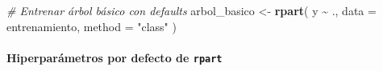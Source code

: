 \documentclass[
]{article}
\newenvironment{Shaded}{\begin{snugshade}}{\end{snugshade}}
\newcommand{\AttributeTok}[1]{\textcolor[rgb]{0.13,0.29,0.53}{#1}}
\newcommand{\CommentTok}[1]{\textcolor[rgb]{0.56,0.35,0.01}{\textit{#1}}}
\newcommand{\FunctionTok}[1]{\textcolor[rgb]{0.13,0.29,0.53}{\textbf{#1}}}
\newcommand{\NormalTok}[1]{#1}
\newcommand{\OtherTok}[1]{\textcolor[rgb]{0.56,0.35,0.01}{#1}}
\newcommand{\SpecialCharTok}[1]{\textcolor[rgb]{0.81,0.36,0.00}{\textbf{#1}}}
\newcommand{\StringTok}[1]{\textcolor[rgb]{0.31,0.60,0.02}{#1}}
\begin{document}
\begin{Shaded}
\begin{Highlighting}[]
\CommentTok{\# Entrenar árbol básico con defaults}
\NormalTok{arbol\_basico }\OtherTok{\textless{}{-}} \FunctionTok{rpart}\NormalTok{(}
\NormalTok{  y }\SpecialCharTok{\textasciitilde{}}\NormalTok{ .,}
  \AttributeTok{data   =}\NormalTok{ entrenamiento,}
  \AttributeTok{method =} \StringTok{"class"}
\NormalTok{)}
\end{Highlighting}
\end{Shaded}

\paragraph{\texorpdfstring{Hiperparámetros por defecto de
\texttt{rpart}}{Hiperparámetros por defecto de rpart}}\label{hiperparuxe1metros-por-defecto-de-rpart}
\end{document}
